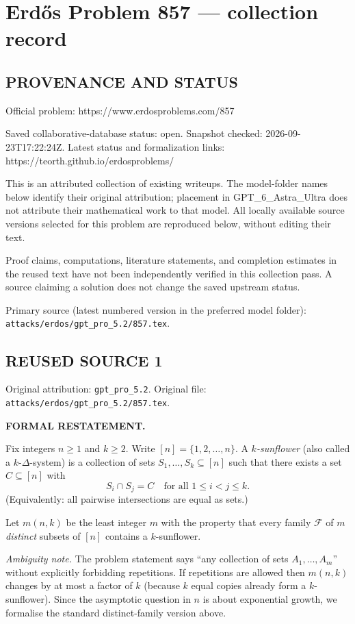 \section*{Erd\H{o}s Problem 857 --- collection record}

\subsection*{PROVENANCE AND STATUS}
Official problem: https://www.erdosproblems.com/857

Saved collaborative-database status: open.
Snapshot checked: 2026-09-23T17:22:24Z.
Latest status and formalization links: https://teorth.github.io/erdosproblems/

This is an attributed collection of existing writeups. The model-folder names below identify their original attribution; placement in GPT\_6\_Astra\_Ultra does not attribute their mathematical work to that model. All locally available source versions selected for this problem are reproduced below, without editing their text.

Proof claims, computations, literature statements, and completion estimates in the reused text have not been independently verified in this collection pass. A source claiming a solution does not change the saved upstream status.

Primary source (latest numbered version in the preferred model folder): \texttt{attacks/erdos/gpt\_pro\_5.2/857.tex}.

\subsection*{REUSED SOURCE 1}
Original attribution: \texttt{gpt\_pro\_5.2}.
Original file: \texttt{attacks/erdos/gpt\_pro\_5.2/857.tex}.


\noindent\textbf{FORMAL RESTATEMENT.}

Fix integers $n\ge 1$ and $k\ge 2$. Write $[n]=\{1,2,\dots,n\}$. A \emph{$k$-sunflower} (also called a $k$-$\Delta$-system) is a collection of sets $S_1,\dots,S_k\subseteq[n]$ such that there exists a set $C\subseteq[n]$ with
\[
S_i\cap S_j = C\quad\text{for all }1\le i<j\le k.
\]
(Equivalently: all pairwise intersections are equal as sets.)

Let $m(n,k)$ be the least integer $m$ with the property that every family $\mathcal F$ of $m$ \emph{distinct} subsets of $[n]$ contains a $k$-sunflower.

\emph{Ambiguity note.} The problem statement says ``any collection of sets $A_1,\dots,A_m$'' without explicitly forbidding repetitions. If repetitions are allowed then $m(n,k)$ changes by at most a factor of $k$ (because $k$ equal copies already form a $k$-sunflower). Since the asymptotic question in $n$ is about exponential growth, we formalise the standard distinct-family version above.

